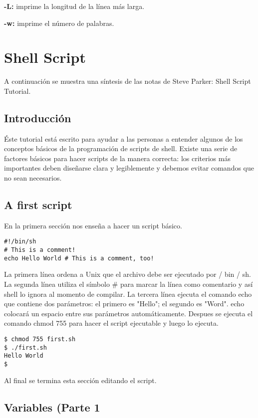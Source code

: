 \documentclass[12pt]{article}
\begin{document}
\textbf{-L:} imprime la longitud de la línea más larga.

\textbf{-w:} imprime el número de palabras.

\section{Shell Script}

A continuación se muestra una síntesis de las notas de Steve Parker: Shell Script Tutorial.

\subsection{Introducción}

Éste tutorial está escrito para ayudar a las personas a entender algunos de los conceptos básicos de la programación de scripts de shell. Existe una serie de factores básicos para hacer scripts de la manera correcta: los criterios más importantes deben diseñarse clara y legiblemente y debemos evitar comandos que no sean necesarios.

\subsection{A first script}

En la primera sección nos enseña a hacer un script básico.

\begin{verbatim}
#!/bin/sh
# This is a comment!
echo Hello World # This is a comment, too!
\end{verbatim}

La primera línea ordena a Unix que el archivo debe ser ejecutado por / bin / sh. La segunda línea utiliza el símbolo \# para marcar la línea como comentario y  así shell lo ignora al momento de compilar. La tercera línea ejecuta el comando echo que contiene dos parámetros: el primero es "Hello"; el segundo es "Word". echo colocará un espacio entre sus parámetros automáticamente. Despues se ejecuta el comando chmod 755 para hacer el script ejecutable y luego lo ejecuta.

\begin{verbatim}
$ chmod 755 first.sh
$ ./first.sh
Hello World
$
\end{verbatim}

Al final se termina esta sección editando el script.

\subsection{Variables (Parte 1}
\end{document}
